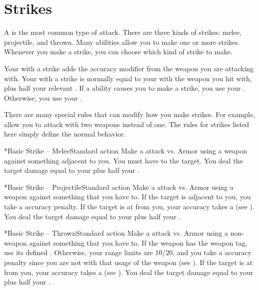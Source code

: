 \section{Strikes}\label{Strikes}
  A  is the most common type of attack.
  There are three kinds of strikes: melee, projectile, and thrown.
  Many abilities allow you to make one or more strikes.
  Whenever you make a strike, you can choose which kind of strike to make.

  Your  with a strike adds the accuracy modifier from the weapon you are attacking with.
  Your  with a strike is normally equal to your  with the weapon you hit with, plus half your relevant .
  If a \magical ability causes you to make a strike, you use your .
  Otherwise, you use your .

  There are many special rules that can modify how you make strikes.
  For example,  allow you to attack with two weapons instead of one.
  The rules for strikes listed here simply define the normal behavior.

  \begin{activeability}*{Basic Strike -- Melee}{Standard action}
    \rankline
    Make a  attack vs. Armor using a weapon against something adjacent to you.
    You must have  to the target.
    \hit You deal the target damage equal to your  plus half your .
  \end{activeability}

  \begin{activeability}*{Basic Strike -- Projectile}{Standard action}
    \rankline
    Make a  attack vs. Armor using a  weapon against something that you have  to.
    If the target is adjacent to you, you take a  accuracy penalty.
    If the target is at  from you, your accuracy takes a   (see ).
    \hit You deal the target damage equal to your  plus half your .
  \end{activeability}

  \begin{activeability}*{Basic Strike -- Thrown}{Standard action}
    \rankline
    Make a  attack vs. Armor using a non- weapon against something that you have  to.
    If the weapon has the  weapon tag, use its defined .
    Otherwise, your range limits are 10/20, and you take a  accuracy penalty since you are not  with that usage of the weapon (see ).
    If the target is at  from you, your accuracy takes a   (see ).
    \hit You deal the target damage equal to your  plus half your .
  \end{activeability}

